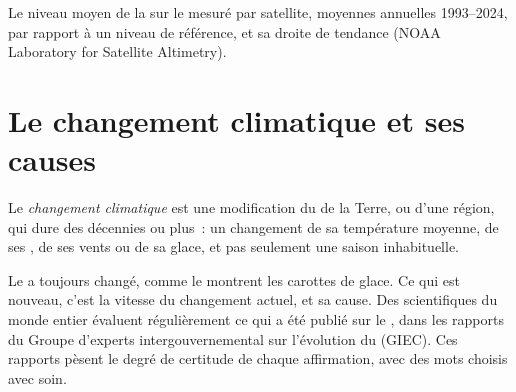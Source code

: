 \begin{omfigure}

{\small Le niveau moyen de la  sur le  mesuré par satellite,
moyennes annuelles 1993--2024, par rapport à un niveau de référence, et
sa droite de tendance (NOAA Laboratory for Satellite Altimetry).}
\label{fig:g9:climate-past-and-present:sea}
\end{omfigure}

\section{Le changement climatique et ses causes}

\begin{definition}\label{def:g9:climate-past-and-present:climate-change}
Le \emph{changement climatique} est une modification du 
de la Terre, ou d'une région, qui dure des décennies ou plus~: un
changement de sa température moyenne, de ses , de ses vents ou de sa
glace, et pas seulement une saison inhabituelle.
\end{definition}

Le  a toujours changé, comme le montrent les carottes de glace. Ce
qui est nouveau, c'est la vitesse du changement actuel, et sa cause. Des
scientifiques du monde entier évaluent régulièrement ce qui a été publié
sur le , dans les rapports du Groupe d'experts intergouvernemental
sur l'évolution du  (GIEC). Ces rapports pèsent le degré de
certitude de chaque affirmation, avec des mots choisis avec soin.

